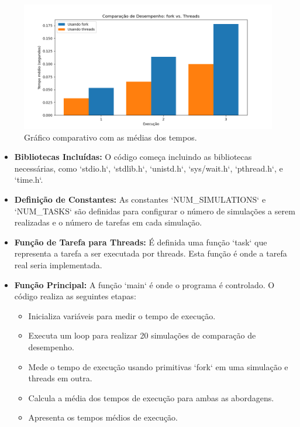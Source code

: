 \documentclass[
	12pt,				%
	openright,			%
	oneside,			%
	a4paper,			%
	chapter=TITLE,		%
	english,			%
	french,				%
	spanish,			%
	brazil				%
	]{abntex2}
\theoremstyle{definition}
\begin{document}
\begin{figure}
    \centering
    \includegraphics[width=1.0\textwidth]{imagens/graf_fork_vs_threads.png}
    \caption{Gráfico comparativo com as médias dos tempos.}
    \label{fig:graf}
\end{figure}


\begin{itemize}
    \item \textbf{Bibliotecas Incluídas:} O código começa incluindo as bibliotecas necessárias, como `stdio.h`, `stdlib.h`, `unistd.h`, `sys/wait.h`, `pthread.h`, e `time.h`.

    \item \textbf{Definição de Constantes:} As constantes `NUM\_SIMULATIONS` e `NUM\_TASKS` são definidas para configurar o número de simulações a serem realizadas e o número de tarefas em cada simulação.

    \item \textbf{Função de Tarefa para Threads:} É definida uma função `task` que representa a tarefa a ser executada por threads. Esta função é onde a tarefa real seria implementada.

    \item \textbf{Função Principal:} A função `main` é onde o programa é controlado. O código realiza as seguintes etapas:
    
    \begin{itemize}
        \item Inicializa variáveis para medir o tempo de execução.
        
        \item Executa um loop para realizar 20 simulações de comparação de desempenho.
        
        \item Mede o tempo de execução usando primitivas `fork` em uma simulação e threads em outra.
        
        \item Calcula a média dos tempos de execução para ambas as abordagens.
        
        \item Apresenta os tempos médios de execução.
    \end{itemize}
\end{itemize}
\end{document}
